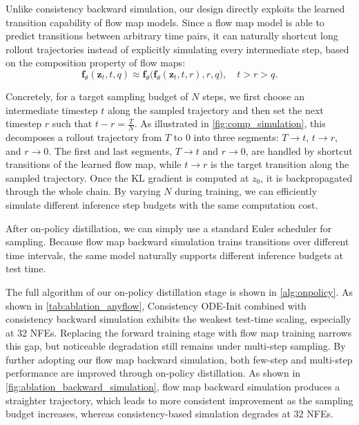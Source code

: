 Unlike consistency backward simulation, our design directly exploits the learned transition capability of flow map models. Since a flow map model is able to predict transitions between arbitrary time pairs, it can naturally shortcut long rollout trajectories instead of explicitly simulating every intermediate step, based on the composition property of flow maps:
\begin{equation}
  \mathbf{f}_{\theta}(\mathbf{z}_t,t,q) \approx \mathbf{f}_{\theta}\big(\mathbf{f}_{\theta}(\mathbf{z}_t,t,r),r,q\big), \quad t>r>q.
\end{equation}

Concretely, for a target sampling budget of $N$ steps, we first choose an intermediate timestep $t$ along the sampled trajectory and then set the next timestep $r$ such that $t-r = \frac{T}{N}$. As illustrated in \cref{fig:comp_simulation}, this decomposes a rollout trajectory from $T$ to $0$ into three segments: $T \to t$, $t \to r$, and $r \to 0$. The first and last segments, $T \to t$ and $r \to 0$, are handled by shortcut transitions of the learned flow map, while $t \to r$ is the target transition along the sampled trajectory. Once the KL gradient is computed at $z_0$, it is backpropagated through the whole chain. By varying $N$ during training, we can efficiently simulate different inference step budgets with the same computation cost.

After on-policy distillation, we can simply use a standard Euler scheduler for sampling. Because flow map backward simulation trains transitions over different time intervals, the same model naturally supports different inference budgets at test time.






 The full algorithm of our on-policy distillation stage is shown in \cref{alg:onpolicy}. As shown in \cref{tab:ablation_anyflow}, Consistency ODE-Init combined with consistency backward simulation exhibits the weakest test-time scaling, especially at 32 NFEs. Replacing the forward training stage with flow map training narrows this gap, but noticeable degradation still remains under multi-step sampling. By further adopting our flow map backward simulation, both few-step and multi-step performance are improved through on-policy distillation. As shown in \cref{fig:ablation_backward_simulation}, flow map backward simulation produces a straighter trajectory, which leads to more consistent improvement as the sampling budget increases, whereas consistency-based simulation degrades at 32 NFEs.


